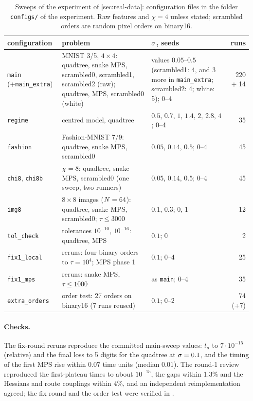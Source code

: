 \begin{table}[ht]
  \centering
  \caption{Sweeps of the experiment of \cref{sec:real-data}: configuration files in the folder
    \texttt{configs/} of the experiment. Raw features and $\chi=4$ unless stated; scrambled orders are
    random pixel orders on binary16.}
  \label{tab:exp-real-data}
  \footnotesize
  \begin{tabularx}{\textwidth}{@{}>{\raggedright\arraybackslash}p{3.0cm}X
      >{\raggedright\arraybackslash}p{3.7cm}r@{}}
    \toprule
    configuration & problem & $\sigma$, seeds & runs \\
    \midrule
    \texttt{main} (+\texttt{main\_extra}) & MNIST 3/5, $4\times4$: quadtree, snake MPS, scrambled0, scrambled1,
      scrambled2 (raw); quadtree, MPS, scrambled0 (white) & 7 values $0.05$--$0.5$ (scrambled1: 4, and 3 more
      in \texttt{main\_extra}; scrambled2: 4; white: 5); 0--4 & 220 + 14 \\
    \texttt{regime} & centred model, quadtree & $0.5$, $0.7$, $1$, $1.4$, $2$, $2.8$, $4$; 0--4 & 35 \\
    \texttt{fashion} & Fashion-MNIST 7/9: quadtree, snake MPS, scrambled0 & $0.05$, $0.14$, $0.5$; 0--4 & 45 \\
    \texttt{chi8}, \texttt{chi8b} & $\chi=8$: quadtree, snake MPS, scrambled0 (one sweep, two runners) &
      $0.05$, $0.14$, $0.5$; 0--4 & 45 \\
    \texttt{img8} & $8\times8$ images ($N=64$): quadtree, snake MPS, scrambled0; $\tau\le3000$ & $0.1$, $0.3$; 0, 1 & 12 \\
    \texttt{tol\_check} & tolerances $10^{-10}$, $10^{-16}$: quadtree, MPS & $0.1$; 0 & 2 \\
    \texttt{fix1\_local} & reruns: four binary orders to $\tau=10^4$; MPS phase 1 & $0.1$; 0--4 & 25 \\
    \texttt{fix1\_mps} & reruns: snake MPS, $\tau\le1000$ & as \texttt{main}; 0--4 & 35 \\
    \texttt{extra\_orders} & order test: 27 orders on binary16 (7 runs reused) & $0.1$; 0--2 & 74 (+7) \\
    \bottomrule
  \end{tabularx}
\end{table}

\paragraph{Checks.}
The fix-round reruns reproduce the committed main-sweep values: $t_a$ to $7\cdot10^{-15}$ (relative) and the
final loss to 5 digits for the quadtree at $\sigma=0.1$, and the timing of the first MPS rise within $0.07$ time
units (median $0.01$). The round-1 review reproduced the first-plateau times to about $10^{-15}$, the gaps
within $1.3\%$ and the Hessians and route couplings within $4\%$, and an independent reimplementation
agreed; the fix round and the order test were verified in .

